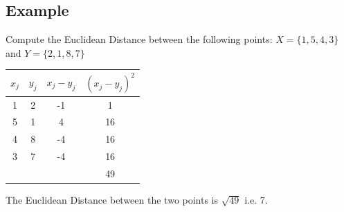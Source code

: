 \documentclass[a4paper,12pt]{report}
\begin{document}
\subsection{Example}
Compute the Euclidean Distance between the following points:
$X = \{1,5,4,3\}$ and $Y = \{2,1,8,7\}$

\begin{center}
	\begin{tabular}{|c|c|c|c|}
		\hline
		$x_j$	&	$y_j$	&   $x_j - y_j$	&	$(x_j - y_j)^2$	\\ \hline
		1	&	2	&	-1	&	1	\\
		5	&	1	&	4	&	16	\\
		4	&	8	&	-4	&	16	\\
		3	&	7	&	-4	&	16	\\ \hline
		&		&		&	49	\\ \hline
	\end{tabular}
\end{center}
The Euclidean Distance between the two points is $\sqrt{49}$ i.e. 7.
\end{document}

